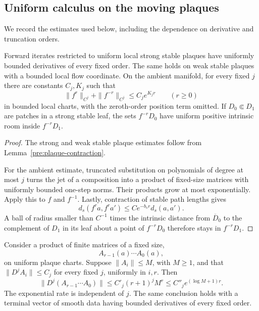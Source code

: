 \subsection{Uniform calculus on the moving plaques}

We record the estimates used below, including the dependence on
derivative and truncation orders.

\begin{lemma}\label{real:iterate-bounds}
Forward iterates restricted to uniform local strong stable plaques
have uniformly bounded derivatives of every fixed order. The same
holds on weak stable plaques with a bounded local flow coordinate.
On the ambient manifold, for every fixed $j$ there are constants
$C_j,K_j$ such that
\[
 \|f^r\|_{C^j}+\|f^{-r}\|_{C^j}\le C_j e^{K_jr}
 \qquad(r\ge0)
\]
in bounded local charts, with the zeroth-order position term omitted.
If $D_0\Subset D_1$ are patches in a strong stable leaf, the sets
$f^{-r}D_0$ have uniform positive intrinsic room inside $f^{-r}D_1$.
\end{lemma}

\begin{proof}
The strong and weak stable plaque estimates follow from
Lemma~\ref{pre:plaque-contraction}.

For the ambient estimate, truncated substitution on polynomials of
degree at most $j$ turns the jet of a composition into a product of
fixed-size matrices with uniformly bounded one-step norms. Their
products grow at most exponentially. Apply this to $f$ and $f^{-1}$.
Lastly, contraction of stable path lengths gives
\[
 d_s(f^r a,f^r a')\le C e^{-b_sr}d_s(a,a').
\]
A ball of radius smaller than $C^{-1}$ times the intrinsic
distance from $\overline D_0$ to the complement of $D_1$ in its leaf
about a point of $f^{-r}D_0$ therefore stays in $f^{-r}D_1$.
\end{proof}

\begin{lemma}\label{real:product-derivatives}
Consider a product of finite matrices of a fixed size,
\[
 A_{r-1}(a)\cdots A_0(a),
\]
on uniform plaque charts. Suppose $\|A_i\|\le M$, with $M\ge1$,
and that $\|D^j A_i\|\le C_j$ for every fixed $j$, uniformly in
$i,r$. Then
\[
 \bigl\|D^j(A_{r-1}\cdots A_0)\bigr\|
    \le C'_j(r+1)^j M^r
    \le C''_j e^{(\log M+1)r}.
\]
The exponential rate is independent of $j$. The same conclusion
holds with a terminal vector of smooth data having bounded
derivatives of every fixed order.
\end{lemma}

